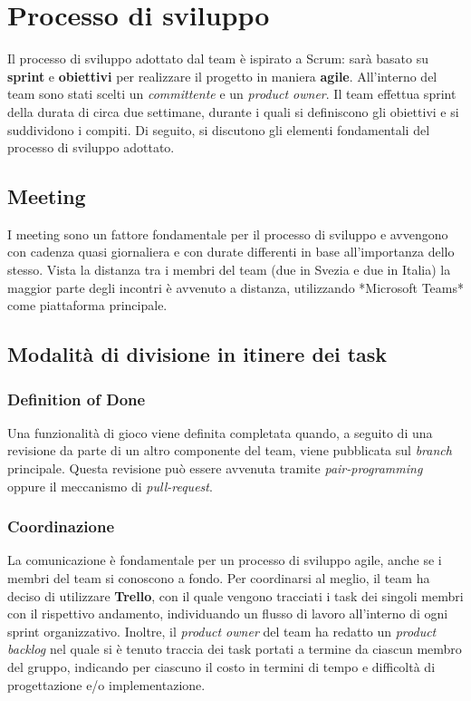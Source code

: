 \section{Processo di sviluppo}
\label{sec:development}
Il processo di sviluppo adottato dal team è ispirato a Scrum: sarà basato su \textbf{sprint} e \textbf{obiettivi}
per realizzare il progetto in maniera \textbf{agile}.
All'interno del team sono stati scelti un \textit{committente} e un \textit{product owner}.
Il team effettua sprint della durata di circa due settimane, durante i quali si definiscono gli obiettivi e si suddividono i compiti.
Di seguito, si discutono gli elementi fondamentali del processo di sviluppo adottato.

\subsection{Meeting}
I meeting sono un fattore fondamentale per il processo di sviluppo e avvengono con cadenza quasi giornaliera
e con durate differenti in base all'importanza dello stesso. Vista la distanza tra i membri del
team (due in Svezia e due in Italia) la maggior parte degli incontri è avvenuto a distanza,
utilizzando *Microsoft Teams* come piattaforma principale.

\subsection{Modalità di divisione in itinere dei task}

\subsubsection{Definition of Done}
Una funzionalità di gioco viene definita completata quando, a seguito di una revisione da parte
di un altro componente del team, viene pubblicata sul \textit{branch} principale. Questa revisione può essere avvenuta
tramite \textit{pair-programming} oppure il meccanismo di \textit{pull-request}.

\subsubsection{Coordinazione}
La comunicazione è fondamentale per un processo di sviluppo agile, anche se i membri del team si conoscono a fondo.
Per coordinarsi al meglio, il team ha deciso di utilizzare \textbf{Trello},
con il quale vengono tracciati i task dei singoli membri con il rispettivo andamento,
individuando un flusso di lavoro all'interno di ogni sprint organizzativo.
Inoltre, il \textit{product owner} del team ha redatto un \textit{product backlog} nel
quale si è tenuto traccia dei task portati a termine da ciascun membro del gruppo, indicando
per ciascuno il costo in termini di tempo e difficoltà di progettazione e/o implementazione.


